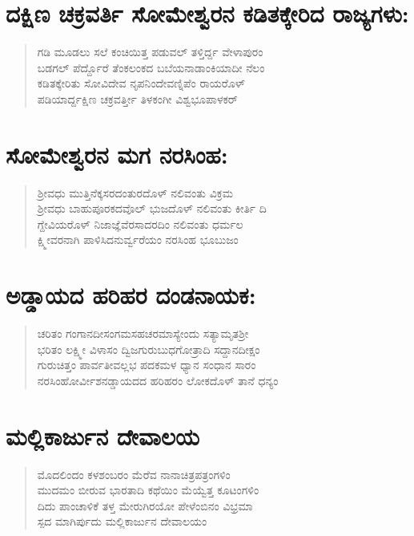 \section{ದಕ್ಷಿಣ ಚಕ್ರವರ್ತಿ ಸೋಮೇಶ್ವರನ ಕಡಿತಕ್ಕೇರಿದ ರಾಜ್ಯಗಳು:}

\begin{verse}
ಗಡಿ ಮೂಡಲು ಸಲೆ ಕಂಚಿಯಿತ್ತ ಪಡುವಲ್​ ತಳ್ತಿರ್ದ್ದ ವೇಳಾಪುರಂ \\ ಬಡಗಲ್​ ಪೆರ್ದ್ದೊರೆ ತೆಂಕಲಂಕದ ಬಬೆಯನಾಡಾಂಕಿಯಾದೀ ನೆಲಂ \\ ಕಡಿತಕ್ಕೇರಿತು ಸೋವಿದೇವ ನೃಪನಿಂದೇವಣ್ನಿಪೆಂ ರಾಯರೊಳ್​ \\ ಪಡಿಯಾರ್ದ್ದಕ್ಷಿಣ ಚಕ್ರವರ್ತ್ತೀ ತಿಳಕಂಗೀ ವಿಶ್ವಭೂಪಾಳಕರ್​
\end{verse}


\section{ಸೋಮೇಶ್ವರನ ಮಗ ನರಸಿಂಹ:}

\begin{verse}
 ಶ‍್ರೀವಧು ಮುತ್ತಿನೆಕ್ಕಸರದಂತುರದೊಳ್​ ನಲಿವಂತು ವಿಕ್ರಮ \\ ಶ‍್ರೀವಧು ಬಾಹುಪೂರಕದವೊಲ್​ ಭುಜದೊಳ್​ ನಲಿವಂತು ಕೀರ್ತಿ ದಿ \\ ಗ್ದೇವಿಯರೊಳ್​ ನಿಜಾಜ್ಞೆವೆರಸಾದರದಿಂ ನಲಿವಂತು ಧರ್ಮಲ \\ ಕ್ಷ್ಮೀವರನಾಗಿ ಪಾಳಿಸಿದನುರ್ವ್ವರೆಯಂ ನರಸಿಂಹ ಭೂಬುಜಂ
\end{verse}


\section{ಅಡ್ಡಾಯದ ಹರಿಹರ ದಂಡನಾಯಕ:}

\begin{verse}
ಚರಿತಂ ಗಂಗಾನದೀಸಂಗಮಸಹಚರಮಾಸ್ಯೇಂದು ಸತ್ಯಾಮೃತಶ‍್ರೀ\\ ಭರಿತಂ ಲಕ್ಷ್ಮೀ ವಿಳಾಸಂ ದ್ವಿಜಗುರುಬುಧಗೋತ್ರಾದಿ ಸದ್ದಾನದೀಕ್ಷಂ \\ ಗುರುಚಿತ್ತಂ ಪಾರ್ವತೀವಲ್ಲಭ ಪದಕಮಳ ಧ್ಯಾನ ಸಂಧಾನ ಸಾರಂ \\ ನರಸಿಂಹೋರ್ವೀಶನಡ್ಡಾಯದದ ಹರಿಹರಂ ಲೋಕದೊಳ್​ ತಾನೆ ಧನ್ಯಂ
\end{verse}


\section{ಮಲ್ಲಿಕಾರ್ಜುನ ದೇವಾಲಯ}

\begin{verse}
ಮೊದಲಿಂದಂ ಕಳಶಂಬರಂ ಮೆರೆವ ನಾನಾಚಿತ್ರಪತ್ರಂಗಳಿಂ \\ ಮುದಮಂ ಬೀರುವ ಭಾರತಾದಿ ಕಥೆಯಿಂ ಮೆಯ್ವೆತ್ತ ಕೂಟಂಗಳಿಂ \\ ದಿದು ಪಾಂಚಾಳಿಕೆ ತಳ್ತ ಮೇರುಗಿರಯೋ ಪೇಳೆಂಬಿನಂ ವಿಭ್ರಮಾ \\ ಸ್ಪದ ಮಾಗಿರ್ಪುದು ಮಲ್ಲಿಕಾರ್ಜುನ ದೇವಾಲಯಂ
\end{verse}


